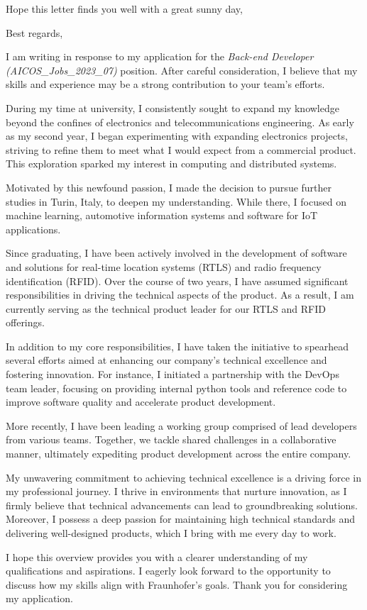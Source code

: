 \documentclass[11pt,a4paper,roman]{moderncv}
\begin{document}
\date{\today}
\opening{Hope this letter finds you well with a great sunny day,}
\closing{Best regards,}
\makelettertitle

I am writing in response to my application for the \emph{Back-end Developer (AICOS\_Jobs\_2023\_07)} position. After careful consideration, I believe that my skills and experience may be a strong contribution to your team's efforts.

During my time at university, I consistently sought to expand my knowledge beyond the confines of electronics and telecommunications engineering. As early as my second year, I began experimenting with expanding electronics projects, striving to refine them to meet what I would expect from a commercial product. This exploration sparked my interest in computing and distributed systems.

Motivated by this newfound passion, I made the decision to pursue further studies in Turin, Italy, to deepen my understanding. While there, I focused on machine learning, automotive information systems and software for IoT applications.

Since graduating, I have been actively involved in the development of software and solutions for real-time location systems (RTLS) and radio frequency identification (RFID). Over the course of two years, I have assumed significant responsibilities in driving the technical aspects of the product. As a result, I am currently serving as the technical product leader for our RTLS and RFID offerings.

In addition to my core responsibilities, I have taken the initiative to spearhead several efforts aimed at enhancing our company's technical excellence and fostering innovation. For instance, I initiated a partnership with the DevOps team leader, focusing on providing internal python tools and reference code to improve software quality and accelerate product development.

More recently, I have been leading a working group comprised of lead developers from various teams. Together, we tackle shared challenges in a collaborative manner, ultimately expediting product development across the entire company.

My unwavering commitment to achieving technical excellence is a driving force in my professional journey. I thrive in environments that nurture innovation, as I firmly believe that technical advancements can lead to groundbreaking solutions. Moreover, I possess a deep passion for maintaining high technical standards and delivering well-designed products, which I bring with me every day to work.

I hope this overview provides you with a clearer understanding of my qualifications and aspirations. I eagerly look forward to the opportunity to discuss how my skills align with Fraunhofer's goals. Thank you for considering my application.

\vspace{0.5cm}

\makeletterclosing
\end{document}
